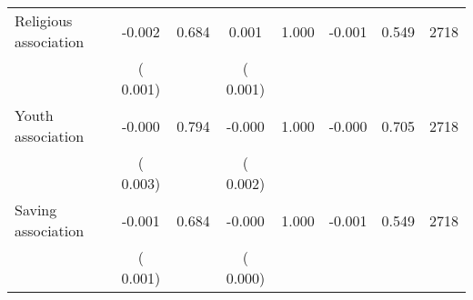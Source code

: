 \begin{tabular}{l*{7}{c}}
 Religious association       &             -0.002       &        0.684  &              0.001       &        1.000  &             -0.001       &              0.549 &  2718 \\ 
                       &       (       0.001)             &                               &       (       0.001)                     &                               &                                               &                                &                      \\ 

 Youth association       &             -0.000       &        0.794  &             -0.000       &        1.000  &             -0.000       &              0.705 &  2718 \\ 
                       &       (       0.003)             &                               &       (       0.002)                     &                               &                                               &                                &                      \\ 

 Saving association       &             -0.001       &        0.684  &             -0.000       &        1.000  &             -0.001       &              0.549 &  2718 \\ 
                       &       (       0.001)             &                               &       (       0.000)                     &                               &                                               &                                &                      \\ 

\hline \end{tabular}